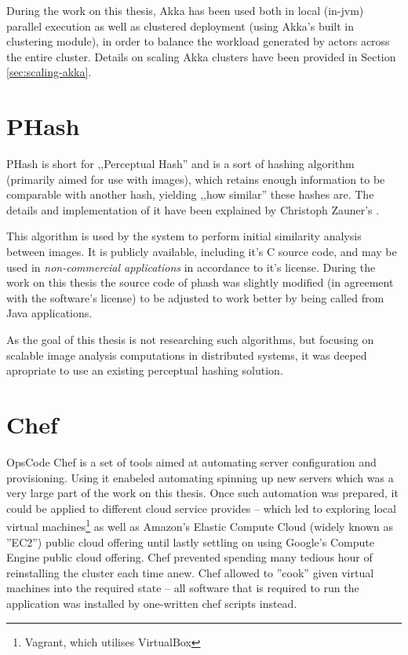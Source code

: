 During the work on this thesis, Akka has been used both in local (in-jvm) parallel execution as well as clustered deployment (using Akka's built in clustering module), in order to balance the workload generated by actors across the entire cluster. Details on scaling Akka clusters have been provided in Section \ref{sec:scaling-akka}.

\section{PHash}
\label{sec:phash}
PHash is short for ,,Perceptual Hash'' and is a sort of hashing algorithm (primarily aimed for use with images), which retains enough information to be comparable with another hash, yielding ,,how similar'' these hashes are. The details and implementation of it have been explained by Christoph Zauner's \cite{phash}.

This algorithm is used by the system to perform initial similarity analysis between images. It is publicly available, including it's C source code, and may be used in \textit{non-commercial applications} in accordance to it's license. During the work on this thesis the source code of phash was slightly modified (in agreement with the software's license) to be adjusted to work better by being called from Java applications.

As the goal of this thesis is not researching such algorithms, but focusing on scalable image analysis computations in distributed systems, it was deeped apropriate to use an existing perceptual hashing solution.

\section{Chef}
\label{sec:chef}
OpsCode Chef is a set of tools aimed at automating server configuration and provisioning. Using it enabeled automating spinning up new servers which was a very large part of the work on this thesis. Once such automation was prepared, it could     be applied to different cloud service provides -- which led to exploring local virtual machines\footnote{Vagrant, which utilises VirtualBox} as well as Amazon's Elastic Compute Cloud (widely known as ''EC2'') public cloud offering until lastly settling on using Google's Compute Engine public cloud offering. Chef prevented spending many  tedious hour of reinstalling the cluster each time anew. Chef allowed to ''cook'' given virtual machines into the required state -- all software that is required to run the application was installed by one-written chef scripts instead.

